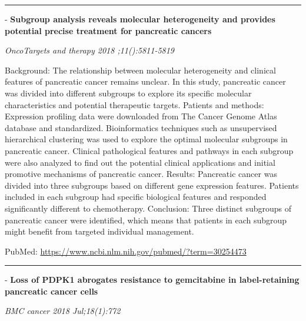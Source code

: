 \documentclass[]{article}
\begin{document}
\begin{center}\rule{0.5\linewidth}{\linethickness}\end{center}

 - \textbf{Subgroup analysis reveals molecular heterogeneity and
provides potential precise treatment for pancreatic cancers}

\emph{OncoTargets and therapy 2018 ;11():5811-5819}

Background: The relationship between molecular heterogeneity and
clinical features of pancreatic cancer remains unclear. In this study,
pancreatic cancer was divided into different subgroups to explore its
specific molecular characteristics and potential therapeutic targets.
Patients and methods: Expression profiling data were downloaded from The
Cancer Genome Atlas database and standardized. Bioinformatics techniques
such as unsupervised hierarchical clustering was used to explore the
optimal molecular subgroups in pancreatic cancer. Clinical pathological
features and pathways in each subgroup were also analyzed to find out
the potential clinical applications and initial promotive mechanisms of
pancreatic cancer. Results: Pancreatic cancer was divided into three
subgroups based on different gene expression features. Patients included
in each subgroup had specific biological features and responded
significantly different to chemotherapy. Conclusion: Three distinct
subgroups of pancreatic cancer were identified, which means that
patients in each subgroup might benefit from targeted individual
management.

PubMed: \url{https://www.ncbi.nlm.nih.gov/pubmed/?term=30254473}

{}

{}

\begin{center}\rule{0.5\linewidth}{\linethickness}\end{center}

 - \textbf{Loss of PDPK1 abrogates resistance to gemcitabine in
label-retaining pancreatic cancer cells}

\emph{BMC cancer 2018 Jul;18(1):772}
\end{document}
